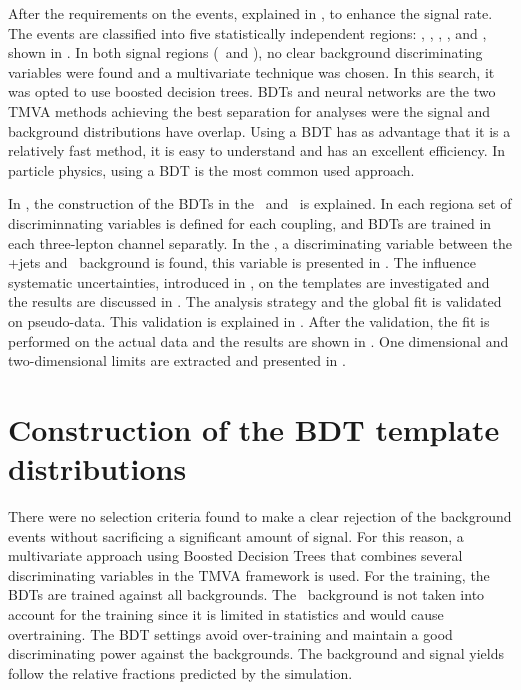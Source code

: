 After the requirements on the events, explained in , to enhance the signal rate. The events are classified into five statistically independent regions: \STSR, \TTSR, \WZCR, \STCR, and \TTCR, shown in . In both signal regions (\STSR\ and \TTSR), no clear background discriminating variables were found and a multivariate technique was chosen. In this search, it was opted to use boosted decision trees. BDTs and neural networks are the two TMVA methods achieving the best separation for analyses were the signal and background distributions have overlap. Using a BDT has as advantage that it is a relatively fast method, it is easy to understand and has an excellent efficiency. In particle physics, using a  BDT is the most common used approach. 

In , the construction of the BDTs in the \STSR\ and \TTCR\ is explained. In each regiona set of discriminnating variables is defined for each coupling, and BDTs are trained in each three-lepton channel separatly. In the \WZCR, a discriminating variable between the \WZ+jets and \NPL\ background is found, this variable is presented in . The influence systematic uncertainties, introduced in , on the templates are investigated and the results are discussed in . The analysis strategy and the global fit is validated on pseudo-data. This validation is explained in . After the validation, the fit is performed on the actual data and the results are shown in . One dimensional and two-dimensional limits are extracted and presented in .


\section{Construction of the BDT template distributions}
\label{sec:templates}
There were no selection criteria found to make a clear rejection of the background events without sacrificing a significant amount of signal. For this reason, a multivariate approach using Boosted Decision Trees that combines several discriminating variables in the TMVA framework is used. For the training, the BDTs are trained against all backgrounds.  The \NPL\ background is not taken into account for the training since it is limited in statistics and would cause overtraining. The BDT settings  avoid over-training and  maintain a good discriminating power against the backgrounds. The background and signal yields follow the relative fractions predicted by the simulation. 

